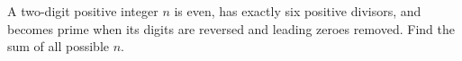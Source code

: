 A two-digit positive integer $n$ is even, has exactly six positive divisors, and becomes prime when its digits are reversed and leading zeroes removed. Find the sum of all possible $n$.
